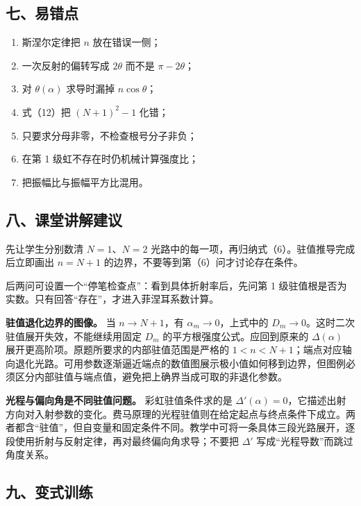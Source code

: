 \documentclass[12pt,a4paper,UTF8]{ctexart}
\newcommand{\tightlist}{\setlength{\itemsep}{0pt}\setlength{\parskip}{0pt}}
\begin{document}
\subsection{七、易错点}\label{ux4e03ux6613ux9519ux70b9-6}

\begin{enumerate}
\def\labelenumi{\arabic{enumi}.}
\tightlist
\item
  斯涅尔定律把 \(n\) 放在错误一侧；
\item
  一次反射的偏转写成 \(2\theta\) 而不是 \(\pi-2\theta\)；
\item
  对 \(\theta(\alpha)\) 求导时漏掉 \(n\cos\theta\)；
\item
  式（12）把 \((N+1)^2-1\) 化错；
\item
  只要求分母非零，不检查根号分子非负；
\item
  在第 1 级虹不存在时仍机械计算强度比；
\item
  把振幅比与振幅平方比混用。
\end{enumerate}

\subsection{八、课堂讲解建议}\label{ux516bux8bfeux5802ux8bb2ux89e3ux5efaux8bae-6}

先让学生分别数清 \(N=1\)、\(N=2\)
光路中的每一项，再归纳式（6）。驻值推导完成后立即画出 \(n=N+1\)
的边界，不要等到第（6）问才讨论存在条件。

后两问可设置一个``停笔检查点''：看到具体折射率后，先问第 1
级驻值根是否为实数。只有回答``存在''，才进入菲涅耳系数计算。

\textbf{驻值退化边界的图像。} 当 \(n\to N+1\)，有
\(\alpha_m\to0\)，上式中的
\(D_m\to0\)。这时二次驻值展开失效，不能继续用固定 \(D_m\)
的平方根强度公式。应回到原来的 \(\Delta(\alpha)\)
展开更高阶项。原题所要求的内部驻值范围是严格的
\(1<n<N+1\)；端点对应轴向退化光路。可用参数逐渐逼近端点的数值图展示极小值如何移到边界，但图例必须区分内部驻值与端点值，避免把上确界当成可取的非退化参数。

\textbf{光程与偏向角是不同驻值问题。} 彩虹驻值条件求的是
\(\Delta'(\alpha)=0\)，它描述出射方向对入射参数的变化。费马原理的光程驻值则在给定起点与终点条件下成立。两者都含``驻值''，但自变量和固定条件不同。教学中可将一条具体三段光路展开，逐段使用折射与反射定律，再对最终偏向角求导；不要把
\(\Delta'\) 写成``光程导数''而跳过角度关系。

\subsection{九、变式训练}\label{ux4e5dux53d8ux5f0fux8badux7ec3-6}
\end{document}
